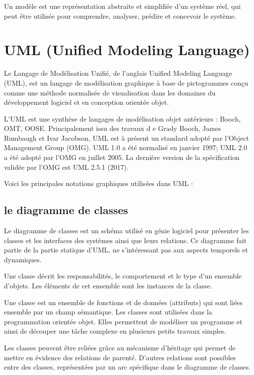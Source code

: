 Un modèle est une représentation abstraite et simplifiée d'un système réel,
qui peut être utilisée pour comprendre, analyser, prédire et concevoir le système.

\section{UML (Unified Modeling Language)}\label{sec:uml}
Le Langage de Modélisation Unifié, de l'anglais Unified Modeling Language (UML),
est un langage de modélisation graphique à base de pictogrammes conçu comme une méthode
normalisée de visualisation dans les domaines du développement logiciel et en conception orientée objet.

L'UML est une synthèse de langages de modélisation objet antérieurs : Booch, OMT, OOSE. Principalement issu des travaux d
e Grady Booch, James Rumbaugh et Ivar Jacobson, UML est à présent un standard adopté par
l'Object Management Group (OMG). UML 1.0 a été normalisé en janvier 1997; UML 2.0
a été adopté par l'OMG en juillet 2005.
La dernière version de la spécification validée par l'OMG est UML 2.5.1 (2017).

Voici les principales notations graphiques utilisées dans UML :

\subsection{le diagramme de classes}\label{subsec:diagrammes-de-classe}
Le diagramme de classes est un schéma utilisé en génie logiciel pour
présenter les classes et les interfaces des systèmes ainsi que leurs relations.
Ce diagramme fait partie de la partie statique d'UML, ne s'intéressant pas aux aspects
temporels et dynamiques.

Une classe décrit les responsabilités, le comportement et le type d'un ensemble d'objets.
Les éléments de cet ensemble sont les instances de la classe.

Une classe est un ensemble de fonctions et de données (attributs) qui sont
liées ensemble par un champ sémantique. Les classes sont utilisées dans la programmation
orientée objet. Elles permettent de modéliser un programme et ainsi de découper une tâche
complexe en plusieurs petits travaux simples.

Les classes peuvent être reliées grâce au mécanisme d'héritage qui permet de mettre en évidence
des relations de parenté. D'autres relations sont possibles entre des classes, représentées par
un arc spécifique dans le diagramme de classes.


